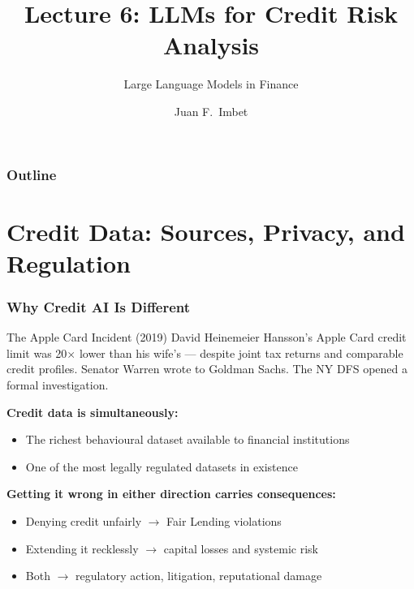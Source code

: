 \documentclass[9pt,t]{beamer}
\title{Lecture 6: LLMs for Credit Risk Analysis}
\subtitle{Large Language Models in Finance}
\author{Juan F.\ Imbet}
\institute{Paris Dauphine -- PSL University}
\date{}
\begin{document}
\begin{frame}
\frametitle{}
\titlepage
\end{frame}

\begin{frame}
\frametitle{Outline}
\tableofcontents
\end{frame}

\section{Credit Data: Sources, Privacy, and Regulation}

\begin{frame}
\frametitle{Why Credit AI Is Different}

\begin{alertblock}{The Apple Card Incident (2019)}
  David Heinemeier Hansson's Apple Card credit limit was 20$\times$ lower than his
  wife's — despite joint tax returns and comparable credit profiles.
  Senator Warren wrote to Goldman Sachs. The NY DFS opened a formal investigation.
\end{alertblock}

\medskip
\textbf{Credit data is simultaneously:}
\begin{itemize}
  \item The richest behavioural dataset available to financial institutions
  \item One of the most legally regulated datasets in existence
\end{itemize}

\medskip
\textbf{Getting it wrong in either direction carries consequences:}
\begin{itemize}
  \item Denying credit unfairly $\to$ Fair Lending violations
  \item Extending it recklessly $\to$ capital losses and systemic risk
  \item Both $\to$ regulatory action, litigation, reputational damage
\end{itemize}
\end{frame}
\end{document}
